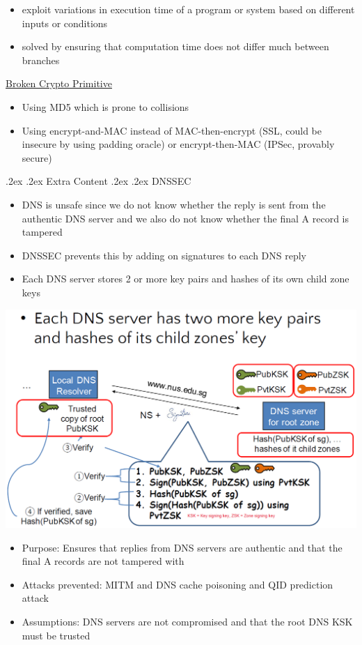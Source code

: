 \documentclass[10pt,landscape,a4paper]{article}
\makeatletter
\renewcommand{\section}{\@startsection{section}{1}{0mm}%
	{.2ex}%
	{.2ex}%
	{\color{myblue}\sffamily\small\bfseries}}
\renewcommand{\subsection}{\@startsection{subsection}{1}{0mm}%
	{.2ex}%
	{.2ex}%
	{\sffamily\bfseries}}
\makeatother
\begin{document}
\begin{multicols*}{4}
\begin{itemize}
\begin{itemize}
		\item exploit variations in execution time of a program or system based on different inputs or conditions
		\item solved by ensuring that computation time does not differ much between branches
	\end{itemize}
\end{itemize}
\underline{Broken Crypto Primitive}
\begin{itemize}
	\item Using MD5 which is prone to collisions
	\item Using encrypt-and-MAC instead of MAC-then-encrypt (SSL, could be insecure by using padding oracle) or encrypt-then-MAC (IPSec, provably secure)
\end{itemize}
\section{Extra Content}
\subsection{DNSSEC}
\begin{itemize}
	\item DNS is unsafe since we do not know whether the reply is sent from the authentic DNS server and we also do not know whether the final A record is tampered
	\item DNSSEC prevents this by adding on signatures to each DNS reply
	\item Each DNS server stores 2 or more key pairs and hashes of its own child zone keys
\end{itemize}
\begin{center}
	\includegraphics[width=0.7\columnwidth]{dnssec}
\end{center}
\begin{itemize}
	\item Purpose: Ensures that replies from DNS servers are authentic and that the final A records are not tampered with
	\item Attacks prevented: MITM and DNS cache poisoning and QID prediction attack
	\item Assumptions: DNS servers are not compromised and that the root DNS KSK must be trusted
\end{itemize}

\end{multicols*}
\end{document}
